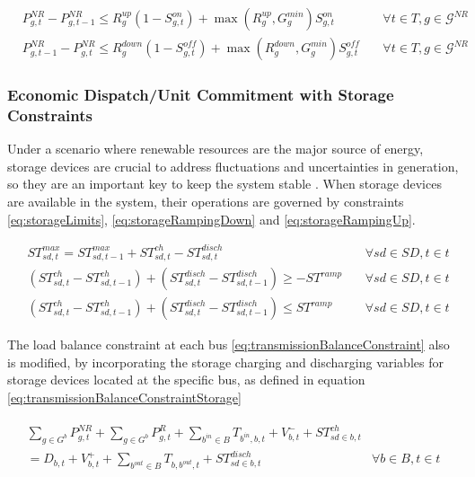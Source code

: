 \documentclass[12pt,LUDisStyle,twosided]{book}
\newcommand{\mc}{\mathcal}
\begin{document}
\begin{subequations}
\begin{alignat}{4}
& P^{NR}_{g,t} - P^{NR}_{g,t - 1} \leq R^{up}_{g}(1 - S^{on}_{g,t}) + \max(R^{up}_{g},G^{min}_{g})S^{on}_{g,t} &~& \forall t \in T, g \in \mc{G}^{NR}\label{eq:rampUpRateUCConstraint} \\
& P^{NR}_{g,t -1 } - P^{NR}_{g,t} \leq R^{down}_{g}(1 - S^{off}_{g,t}) + \max(R^{down}_{g},G^{min}_{g})S^{off}_{g,t} &~& \forall t \in T, g \in \mc{G}^{NR}\label{eq:rampDownRateUCConstraint}
\end{alignat} 
\end{subequations}


\subsubsection{Economic Dispatch/Unit Commitment with Storage Constraints}

Under a scenario where renewable resources are the major source of energy, storage devices are crucial to address fluctuations and uncertainties in generation, so they are an important key to keep the system stable \cite{dwyer}. When storage devices are available in the system, their operations are governed by constraints \eqref{eq:storageLimits}, \eqref{eq:storageRampingDown} and \eqref{eq:storageRampingUp}.

\begin{subequations}\label{model:storageConstraints}
\begin{alignat}{4}
& ST^{max}_{sd,t} = ST^{max}_{sd,t - 1} + ST^{ch}_{sd,t} - ST^{disch}_{sd,t}  &~& \forall sd \in SD, t \in t \label{eq:storageLimits} \\
& (ST^{ch}_{sd,t} - ST^{ch}_{sd,t-1}) + (ST^{disch}_{sd,t} - ST^{disch}_{sd,t-1}) \geq -ST^{ramp} &~& \forall sd \in SD, t \in t \label{eq:storageRampingDown} \\
& (ST^{ch}_{sd,t} - ST^{ch}_{sd,t-1}) + (ST^{disch}_{sd,t} - ST^{disch}_{sd,t-1}) \leq ST^{ramp}  &~& \forall sd \in SD, t \in t \label{eq:storageRampingUp}
\end{alignat} 
\end{subequations}

The load balance constraint at each bus \eqref{eq:transmissionBalanceConstraint} also is modified, by incorporating the storage charging and discharging variables for storage devices located at the specific bus, as defined in equation \eqref{eq:transmissionBalanceConstraintStorage}

\begin{subequations}
\begin{align}
\begin{split}
\sum_{g \in G^{b}} P^{NR}_{g,t} + \sum_{g \in G^{b}} P^{R}_{g,t} + \sum_{b^{in} \in B} T_{b^{in},b,t} + V^{-}_{b,t}  + ST^{ch}_{sd \in b,t} &
\\ = D_{b,t}  + V^{+}_{b,t} + \sum_{b^{out} \in B} T_{b,b^{out},t} + ST^{disch}_{sd \in b,t}  & \forall b \in B, t \in t \label{eq:transmissionBalanceConstraintStorage}
\end{split}
\end{align} 
\end{subequations}
\end{document}
